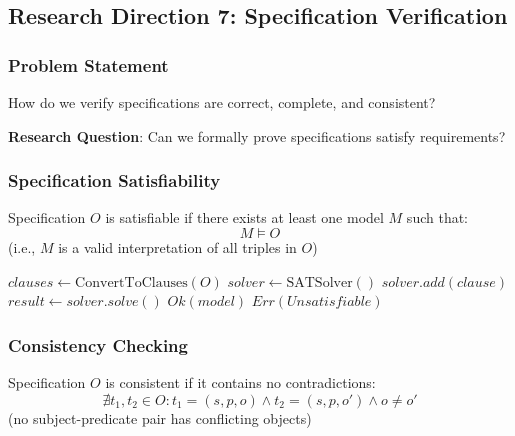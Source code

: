 \subsection{Research Direction 7: Specification Verification}

\subsubsection{Problem Statement}

How do we verify specifications are correct, complete, and consistent?

\textbf{Research Question}: Can we formally prove specifications satisfy requirements?

\subsubsection{Specification Satisfiability}

\begin{definition}
    Specification $O$ is satisfiable if there exists at least one model $M$ such that:
    \begin{equation}
        M \models O
    \end{equation}
    (i.e., $M$ is a valid interpretation of all triples in $O$)
\end{definition}

\begin{algorithm}
\caption{Satisfiability Checking}
\begin{algorithmic}[1]
    \State $clauses \gets \text{ConvertToClauses}(O)$ 
    \State $solver \gets \text{SATSolver}()$
        \State $solver.add(clause)$
    \EndFor
    \State $result \gets solver.solve()$
        \State \Return $Ok(model)$
    \Else
        \State \Return $Err(Unsatisfiable)$
    \EndIf
\EndProcedure
\end{algorithmic}
\end{algorithm}

\subsubsection{Consistency Checking}

\begin{definition}
    Specification $O$ is consistent if it contains no contradictions:
    \begin{equation}
        \nexists t_1, t_2 \in O : t_1 = (s, p, o) \land t_2 = (s, p, o') \land o \neq o'
    \end{equation}
    (no subject-predicate pair has conflicting objects)
\end{definition}

